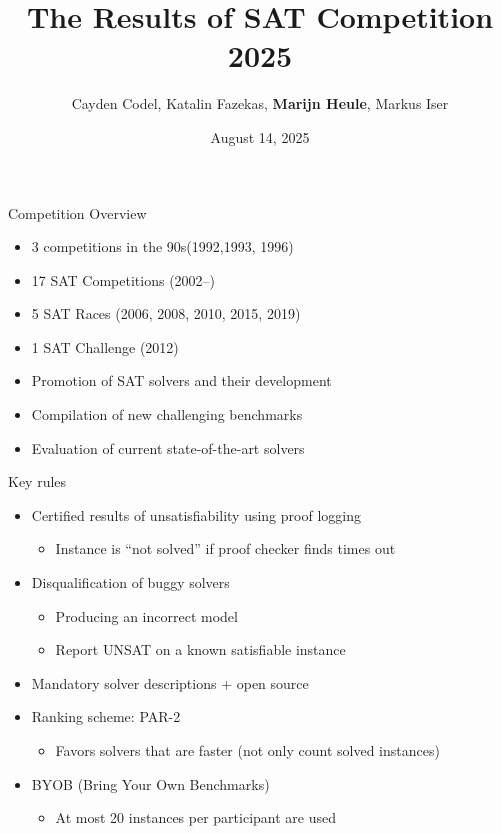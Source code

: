 \documentclass{beamer}
\title[SAT Competition 2023]{{\bf The Results of SAT Competition 2025}}%
\author[Codel, Fazekas, Heule, Iser] {Cayden Codel, Katalin Fazekas, {\bf Marijn Heule},
{Markus Iser}}
\institute[] %
{\Large 
SAT 2025 Conference, Glasgow, Scotland \\ %
}
\date{August 14, 2025} %
\begin{document}
\begin{frame}
\titlepage %
\end{frame}

\begin{frame}{Competition Overview}

\begin{itemize}
\item 3 competitions in the 90s\hfill (1992,1993, 1996)
\item 17 SAT Competitions \hfill (2002--)
\item 5 SAT Races \hfill (2006, 2008, 2010, 2015, 2019)
\item 1 SAT Challenge \hfill (2012)
\end{itemize}

\bigskip
\bigskip

\begin{itemize}
\item Promotion of SAT solvers and their development
\item Compilation of new challenging benchmarks
\item Evaluation of current state-of-the-art solvers
\end{itemize}

\end{frame}


\begin{frame}{Key rules}
\begin{itemize}
\item Certified results of unsatisfiability using proof logging
  \begin{itemize}
  \item Instance is ``not solved'' if proof checker finds times out
  \end{itemize}
\medskip
\item Disqualification of buggy solvers
  \begin{itemize}
  \item Producing an incorrect model
  \item Report UNSAT on a known satisfiable instance
  \end{itemize}
\medskip
\item Mandatory solver descriptions + open source
\medskip
\item Ranking scheme: PAR-2
\begin{itemize}
\item Favors solvers that are faster (not only count solved instances)
\end{itemize}
\medskip
\item BYOB (Bring Your Own Benchmarks)
\begin{itemize}
\item At most 20 instances per participant are used
\end{itemize} 
\end{itemize}
\end{frame}
\end{document}
